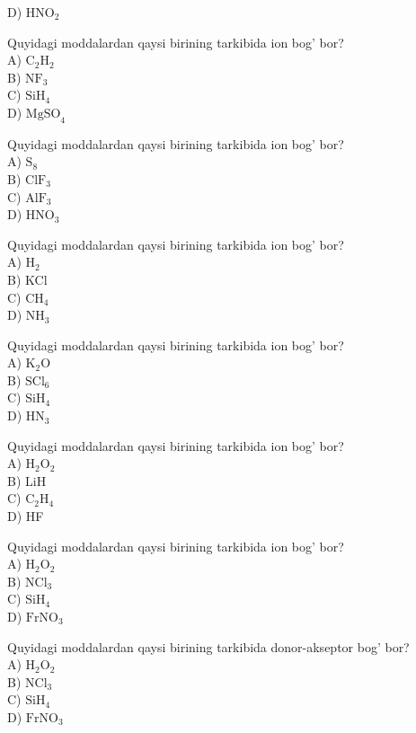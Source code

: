 D) $\mathrm{HNO}_{2}$
  \item Quyidagi moddalardan qaysi birining tarkibida ion bog' bor?\\
A) $\mathrm{C}_{2} \mathrm{H}_{2}$\\
B) $\mathrm{NF}_{3}$\\
C) $\mathrm{SiH}_{4}$\\
D) $\mathrm{MgSO}_{4}$
  \item Quyidagi moddalardan qaysi birining tarkibida ion bog' bor?\\
A) $\mathrm{S}_{8}$\\
B) $\mathrm{ClF}_{3}$\\
C) $\mathrm{AlF}_{3}$\\
D) $\mathrm{HNO}_{3}$
  \item Quyidagi moddalardan qaysi birining tarkibida ion bog' bor?\\
A) $\mathrm{H}_{2}$\\
B) KCl\\
C) $\mathrm{CH}_{4}$\\
D) $\mathrm{NH}_{3}$
  \item Quyidagi moddalardan qaysi birining tarkibida ion bog' bor?\\
A) $\mathrm{K}_{2} \mathrm{O}$\\
B) $\mathrm{SCl}_{6}$\\
C) $\mathrm{SiH}_{4}$\\
D) $\mathrm{HN}_{3}$
  \item Quyidagi moddalardan qaysi birining tarkibida ion bog' bor?\\
A) $\mathrm{H}_{2} \mathrm{O}_{2}$\\
B) LiH\\
C) $\mathrm{C}_{2} \mathrm{H}_{4}$\\
D) HF
  \item Quyidagi moddalardan qaysi birining tarkibida ion bog' bor?\\
A) $\mathrm{H}_{2} \mathrm{O}_{2}$\\
B) $\mathrm{NCl}_{3}$\\
C) $\mathrm{SiH}_{4}$\\
D) $\mathrm{FrNO}_{3}$
  \item Quyidagi moddalardan qaysi birining tarkibida donor-akseptor bog' bor?\\
A) $\mathrm{H}_{2} \mathrm{O}_{2}$\\
B) $\mathrm{NCl}_{3}$\\
C) $\mathrm{SiH}_{4}$\\
D) $\mathrm{FrNO}_{3}$
